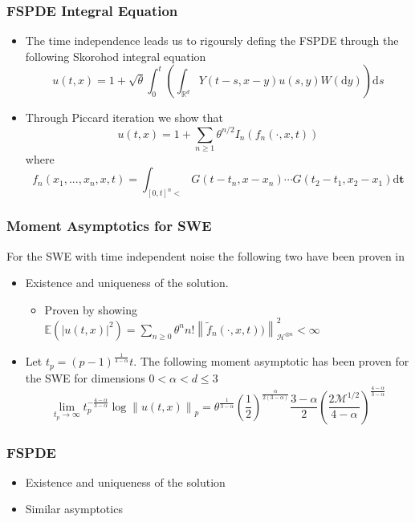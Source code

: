 \documentclass[11pt]{beamer}
\numberwithin{equation}{section}
\newcommand{\R}{\mathbb{R}}
\newcommand{\Norm}[1]{\left\|  #1   \right\|}
\newcommand{\ud}{\ensuremath{\mathrm{d}}}
\begin{document}
\begin{frame}[t]
\frametitle{FSPDE Integral Equation}
\begin{itemize}
	\item The time independence leads us to rigoursly defing the FSPDE through the following Skorohod integral equation 
	\[
	u(t,x) = 1 + \sqrt{\theta}\int_0^t \left( \int_{\R^d} Y(t-s,x-y)u(s,y) W(\ud y)  \right) \ud s
	\]
	\item Through Piccard iteration we show that 
	\[
	u(t,x) = 1 + \sum_{n \ge 1} \theta^{n/2}I_n(f_n(\cdot,x,t))
	\] 
	where
	\[
	f_n(x_1,...,x_n,x,t) = \int_{[0,t]^n<} G(t-t_n,x-x_n)\cdots G(t_2-t_1,x_2-x_1) \ud \textbf{t}
	\]
\end{itemize}

\end{frame}

\begin{frame}[t]
	\frametitle{Moment Asymptotics for SWE }
	For the SWE with time independent noise the following two have been proven in \cite{LeXiaReb}
	\begin{itemize}
		\item Existence and uniqueness of the solution. 
				\begin{itemize}
					\item Proven by showing $\mathbb{E}(|u(t,x)|^2) = \sum_{n \ge 0}\theta^nn!\Norm{\tilde{f}_n(\cdot,x,t))}_{\mathcal{H}^{\otimes n}}^2 < \infty$
				\end{itemize}
		\item Let $t_p = (p-1)^{\frac{1}{4-\alpha}}t$. The following moment asymptotic has been proven for the SWE for dimensions $0 < \alpha < d \le 3$
				\[
			\lim_{t_p \to \infty} t_p^{-\frac{4-\alpha}{3-\alpha}}\log\Norm{u(t,x)}_p = \theta^{\frac{1}{3-\alpha}}\left(\frac{1}{2}\right)^{\frac{\alpha}{2(3-\alpha)}}\frac{3-\alpha}{2}\left(\frac{2\mathcal{M}^{1/2}}{4-\alpha} \right)^{\frac{{4-\alpha}}{3-\alpha}}
				\]
	\end{itemize}	
\end{frame}

\begin{frame}[t]
	\frametitle{FSPDE}
	\begin{itemize}
		\item Existence and uniqueness of the solution
		\item Similar asymptotics 
	\end{itemize}
\end{frame}
\end{document}
